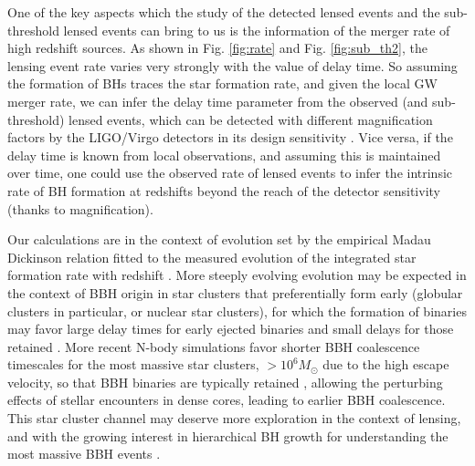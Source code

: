 \documentclass[a4paper,useAMS,usenatbib]{mnras}
\begin{document}
One of the key aspects which the study of the detected lensed events and the sub-threshold lensed events can bring to us is the information of the merger rate of high redshift sources. As shown in Fig. \ref{fig:rate} and Fig. \ref{fig:sub_th2}, the lensing event rate varies very strongly with the value of delay time. So assuming the formation of BHs traces the star formation rate, and given the local GW merger rate, we can infer the delay time parameter from the observed (and sub-threshold) lensed events,  which can be detected with different magnification factors by the LIGO/Virgo detectors in its design sensitivity \citep{Aasi:2013wya, TheLIGOScientific:2014jea, TheVirgo:2014hva}. Vice versa, if the delay time is known from local observations, and assuming this is maintained over time, one could use the observed rate of lensed events to infer the intrinsic rate of BH formation at redshifts beyond the reach of the detector sensitivity (thanks to magnification). 

Our calculations are in the context of evolution set by the empirical Madau Dickinson relation fitted to the measured evolution of the integrated star formation rate with redshift \citep{Madau:2014bja}. More steeply evolving evolution may be expected in the context of BBH origin in star clusters that preferentially form early (globular clusters in particular, or nuclear star clusters), for which the formation of binaries may favor large delay times for early ejected binaries \citep{1993Natur.364..423S} and small delays for those retained \citep{2010MNRAS.402..371B}. More recent N-body simulations favor shorter BBH coalescence timescales for the most massive star clusters, $>10^6M_\odot$ due to the high escape velocity, so that BBH binaries are typically retained \citep{2013ApJ...763L..15M,2018PhRvD..98l3005R}, allowing the perturbing effects of stellar encounters in dense cores, leading to earlier BBH coalescence. This star cluster channel may deserve more exploration in the context of lensing, and with the growing interest in hierarchical BH growth for understanding the most massive BBH events \citep{2019MNRAS.487.2947D, 2020ApJ...896L..10R}.

\
\end{document}
